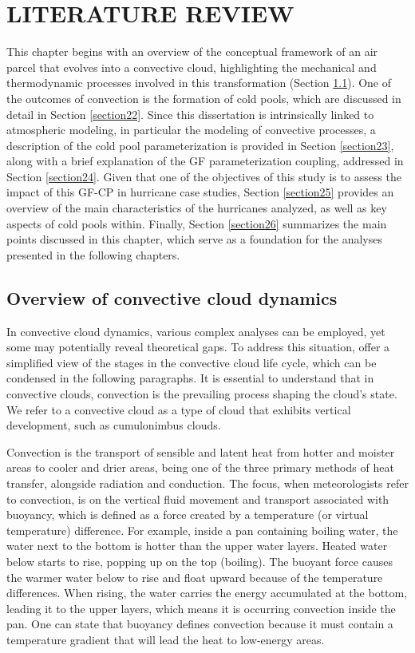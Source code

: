 \chapter{LITERATURE REVIEW}
\label{chapter2}


This chapter begins with an overview of the conceptual framework of an air parcel that evolves into a convective cloud, highlighting the mechanical and thermodynamic processes involved in this transformation (Section \ref{section21}). One of the outcomes of convection is the formation of cold pools, which are discussed in detail in Section \ref{section22}. Since this dissertation is intrinsically linked to atmospheric modeling, in particular the modeling of convective processes, a description of the cold pool parameterization is provided in Section \ref{section23}, along with a brief explanation of the GF parameterization coupling, addressed in Section \ref{section24}. Given that one of the objectives of this study is to assess the impact of this GF-CP in hurricane case studies, Section \ref{section25} provides an overview of the main characteristics of the hurricanes analyzed, as well as key aspects of cold pools within. Finally, Section \ref{section26} summarizes the main points discussed in this chapter, which serve as a foundation for the analyses presented in the following chapters.

\section{Overview of convective cloud dynamics}
\label{section21}

In convective cloud dynamics, various complex analyses can be employed, yet some may potentially reveal theoretical gaps. To address this situation,  offer a simplified view of the stages in the convective cloud life cycle, which can be condensed in the following paragraphs. It is essential to understand that in convective clouds, convection is the prevailing process shaping the cloud's state. We refer to a convective cloud as a type of cloud that exhibits vertical development, such as cumulonimbus clouds.

Convection is the transport of sensible and latent heat from hotter and moister areas to cooler and drier areas, being one of the three primary methods of heat transfer, alongside radiation and conduction. The focus, when meteorologists refer to convection, is on the vertical fluid movement and transport associated with buoyancy, which is defined as a force created by a temperature (or virtual temperature) difference. For example, inside a pan containing boiling water, the water next to the bottom is hotter than the upper water layers. Heated water below starts to rise, popping up on the top (boiling). The buoyant force causes the warmer water below to rise and float upward because of the temperature differences. When rising, the water carries the energy accumulated at the bottom, leading it to the upper layers, which means it is occurring convection inside the pan. One can state that buoyancy defines convection because it must contain a temperature gradient that will lead the heat to low-energy areas.

